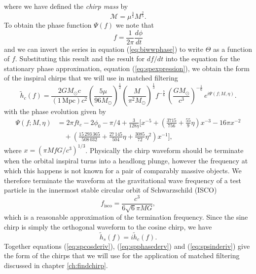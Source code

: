 where we have defined the \emph{chirp mass} by
\begin{equation}
\mathcal{M} = \mu^\frac{3}{5} M^\frac{2}{5}.
\end{equation}
To obtain the phase function $\Psi(f)$ we note that
\begin{equation}
f = \frac{1}{2\pi} \frac{d\phi}{dt}
\end{equation}
and we can invert the series in equation (\ref{eq:biwwphase}) to write
$\Theta$ as a function of $f$. Substituting this result and the result for
$df/dt$ into the equation for the stationary phase approximation, equation
(\ref{eq:spexpression}), we obtain the form of the inspiral chirps that we
will use in matched filtering
\begin{equation}
\label{eq:spcosderiv}
\tilde{h}_c(f)=\frac{2GM_\odot c}{(1\,\mathrm{Mpc})c^2}
\left(\frac{5\mu}{96M_\odot}\right)^\frac{1}{2}
\left(\frac{M}{\pi^2M_\odot}\right)^\frac{1}{3}
f^{-\frac{7}{6}}\, \left( \frac{GM_\odot}{c^3} \right)^{-\frac{1}{6}}\,
e^{i\Psi(f;M,\eta)}.
\end{equation}
with the phase evolution given by
\begin{equation}
\begin{split}
\Psi(f;M,\eta) &= 2\pi ft_c-2\phi_0-\pi/4+\frac{3}{128\eta}\biggl[x^{-5}+
\left(\frac{3715}{756}+\frac{55}{9}\eta\right)x^{-3}
-16\pi x^{-2} \\
&\quad +\left(\frac{15\,293\,365}{508\,032}+\frac{27\,145}{504}\eta
+\frac{3085}{72}\eta^2\right)x^{-1}\biggr],
\label{eq:spphasederv}
\end{split}
\end{equation}
where $x=(\pi M f G/c^3)^{1/3}$. Physically the chirp waveform should be
terminate when the orbital inspiral turns into a headlong plunge, however the
frequency at which this happens is not known for a pair of comparably massive
objects. We therefore terminate the waveform at the gravitational wave
frequency of a test particle in the innermost stable circular orbit of
Schwarzschild (ISCO)\cite{Wald:1984}
\begin{equation}
f_\mathrm{isco} = \frac{c^3}{6\sqrt{6}\pi M G},
\end{equation}
which is a reasonable approximation of the termination
frequency\cite{Droz:1999qx}. Since the sine chirp is simply the orthogonal
waveform to the cosine chirp, we have
\begin{equation}
\tilde{h}_s(f)=i\tilde{h}_c(f).
\label{eq:spsinderiv}
\end{equation}
Together equations (\ref{eq:spcosderiv}), (\ref{eq:spphasederv}) and
(\ref{eq:spsinderiv}) give the form of the chirps that we will use for the
application of matched filtering discussed in chapter \ref{ch:findchirp}.

